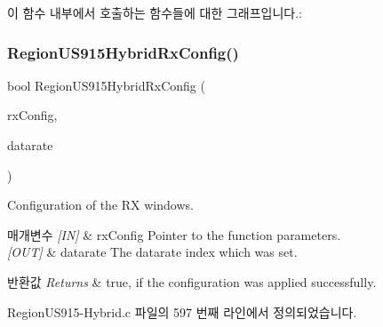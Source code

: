 이 함수 내부에서 호출하는 함수들에 대한 그래프입니다.\+:
\mbox{\label{group___r_e_g_i_o_n_u_s915_h_y_b_ga0f982743b1649a9491067676307a2e75}} 
\subsubsection{\texorpdfstring{Region\+U\+S915\+Hybrid\+Rx\+Config()}{RegionUS915HybridRxConfig()}}
{\footnotesize\ttfamily bool Region\+U\+S915\+Hybrid\+Rx\+Config (\begin{DoxyParamCaption}\item[{\mbox{\hyperlink{group___r_e_g_i_o_n_ga375c038078dfcfc7ef14280021db719e}{Rx\+Config\+Params\+\_\+t}} $\ast$}]{rx\+Config,  }\item[{int8\+\_\+t $\ast$}]{datarate }\end{DoxyParamCaption})}



Configuration of the RX windows. 


\begin{DoxyParams}{매개변수}
{\em \mbox{[}\+I\+N\mbox{]}} & rx\+Config Pointer to the function parameters.\\
\hline
{\em \mbox{[}\+O\+U\+T\mbox{]}} & datarate The datarate index which was set.\\
\hline
\end{DoxyParams}

\begin{DoxyRetVals}{반환값}
{\em Returns} & true, if the configuration was applied successfully. \\
\hline
\end{DoxyRetVals}


Region\+U\+S915-\/\+Hybrid.\+c 파일의 597 번째 라인에서 정의되었습니다.



